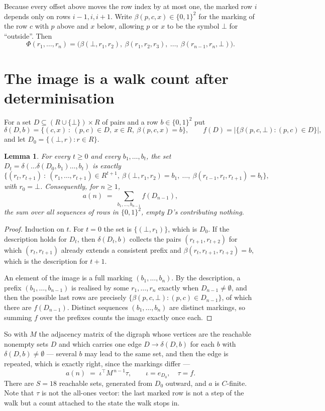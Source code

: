 \documentclass[11pt,a4paper]{article}
\theoremstyle{plain}
\newtheorem{lemma}[theorem]{Lemma}
\theoremstyle{definition}
\begin{document}
Because every offset above moves the row index by at most one, the marked row $i$ depends only
on rows $i-1,i,i+1$. Write $\beta(p,c,x)\in\{0,1\}^{2}$ for the marking of the row $c$
with $p$ above and $x$ below, allowing $p$ or $x$ to be the symbol $\bot$ for ``outside''.
Then
\[
\Phi(r_1,\dots,r_n)=\bigl(\beta(\bot,r_1,r_2),\ \beta(r_1,r_2,r_3),\ \dots,\
\beta(r_{n-1},r_n,\bot)\bigr).
\]

\section{The image is a walk count after determinisation}

For a set $D\subseteq(R\cup\{\bot\})\times R$ of pairs and a row $b\in\{0,1\}^{2}$ put
\[
\delta(D,b)=\{(c,x)\ :\ (p,c)\in D,\ x\in R,\ \beta(p,c,x)=b\},\qquad
f(D)=\bigl|\{\beta(p,c,\bot):(p,c)\in D\}\bigr| ,
\]
and let $D_0=\{(\bot,r):r\in R\}$.

\begin{lemma}\label{lem:det}
For every $t\ge0$ and every $b_1,\dots,b_t$, the set
$D_t=\delta(\dots\delta(D_0,b_1)\dots,b_t)$ is exactly
\[
\{(r_t,r_{t+1})\ :\ (r_1,\dots,r_{t+1})\in R^{t+1},\ \beta(\bot,r_1,r_2)=b_1,\ \dots,\
\beta(r_{t-1},r_t,r_{t+1})=b_t\} ,
\]
with $r_0=\bot$. Consequently, for $n\ge1$,
\[
a(n)\;=\;\sum_{b_1,\dots,b_{n-1}}f(D_{n-1}),
\]
the sum over all sequences of rows in $\{0,1\}^{2}$, empty $D$'s contributing nothing.
\end{lemma}

\begin{proof}
Induction on $t$. For $t=0$ the set is $\{(\bot,r_1)\}$, which is $D_0$. If the description
holds for $D_t$, then $\delta(D_t,b)$ collects the pairs $(r_{t+1},r_{t+2})$ for which
$(r_t,r_{t+1})$ already extends a consistent prefix and
$\beta(r_t,r_{t+1},r_{t+2})=b$, which is the description for $t+1$.

An element of the image is a full marking $(b_1,\dots,b_n)$. By the description, a prefix
$(b_1,\dots,b_{n-1})$ is realised by some $r_1,\dots,r_n$ exactly when $D_{n-1}\neq
\emptyset$, and then the possible last rows are precisely
$\{\beta(p,c,\bot):(p,c)\in D_{n-1}\}$, of which there are $f(D_{n-1})$. Distinct
sequences $(b_1,\dots,b_n)$ are distinct markings, so summing $f$ over the prefixes counts the
image exactly once each.
\end{proof}

So with $M$ the adjacency matrix of the digraph whose vertices are the reachable nonempty sets
$D$ and which carries one edge $D\to\delta(D,b)$ for each $b$ with $\delta(D,b)\neq\emptyset$
--- several $b$ may lead to the same set, and then the edge is repeated, which is exactly
right, since the markings differ ---
\[
a(n)\;=\;\iota^{\!\top}M^{\,n-1}\tau,\qquad \iota=e_{D_0},\quad \tau=f .
\]
There are $S=18$ reachable sets, generated from $D_0$ outward, and $a$ is $C$-finite. Note
that $\tau$ is not the all-ones vector: the last marked row is not a step of the walk but a
count attached to the state the walk stops in.
\end{document}
